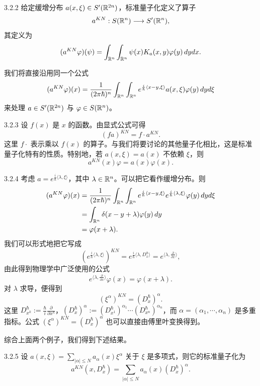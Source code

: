
\begin{proposition}{3.2.2}
给定缓增分布 $a(x,\xi)\in S'(\mathbb{R}^{2n})$，标准量子化定义了算子
\[
a^{KN}:S(\mathbb{R}^n)\longrightarrow S'(\mathbb{R}^n),
\]
其定义为
\[
(a^{KN}\varphi)(\psi)=\int_{\mathbb{R}^n}\int_{\mathbb{R}^n}\psi(x)K_a(x,y)\varphi(y)\,dydx.
\]
\end{proposition}

我们将直接沿用同一个公式
\[
(a^{KN}\varphi)(x)
=\frac{1}{(2\pi\hbar)^n}\int_{\mathbb{R}^n}\int_{\mathbb{R}^n}e^{\frac i\hbar\langle x-y,\xi\rangle}a(x,\xi)\varphi(y)\,dyd\xi
\]
来处理 $a\in S'(\mathbb{R}^{2n})$ 与 $\varphi\in S(\mathbb{R}^n)$。

\begin{example}{3.2.3}
设 $f(x)$ 是 $x$ 的函数。由显式公式可得
\[
(fa)^{KN}=f\cdot a^{KN}.
\]
这里 $f\cdot$ 表示乘以 $f(x)$ 的算子。与我们将要讨论的其他量子化相比，这是标准量子化特有的性质。特别地，若 $a(x,\xi)=a(x)$ 不依赖 $\xi$，则
\[
a^{KN}(x)\varphi=a(x)\varphi(x).
\]
\end{example}

\begin{example}{3.2.4}
考虑 $a=e^{\frac i\hbar\langle\lambda,\xi\rangle}$，其中 $\lambda\in\mathbb{R}^n$。可以把它看作缓增分布。则
\begin{align*}
(a^{KN}\varphi)(x)
&=\frac{1}{(2\pi\hbar)^n}\int_{\mathbb{R}^n}\int_{\mathbb{R}^n}e^{\frac i\hbar\langle x-y,\xi\rangle}e^{\frac i\hbar\langle\lambda,\xi\rangle}\varphi(y)\,dyd\xi\\
&=\int_{\mathbb{R}^n}\delta(x-y+\lambda)\varphi(y)\,dy\\
&=\varphi(x+\lambda).
\end{align*}
我们可以形式地把它写成
\[
\left(e^{\frac i\hbar\langle\lambda,\xi\rangle}\right)^{KN}
=e^{\frac i\hbar\langle\lambda,D_{x}^\hbar\rangle}
=e^{\langle\lambda,\frac{\partial}{\partial x}\rangle},
\]
由此得到物理学中广泛使用的公式
\[
e^{\langle\lambda,\frac{\partial}{\partial x}\rangle}\varphi(x)=\varphi(x+\lambda).
\]
对 $\lambda$ 求导，便得到
\[
(\xi^\alpha)^{KN}=(D_{x}^\hbar)^\alpha.
\]
这里 $D^\hbar_{x^k}:=\frac{\hbar}{i}\frac{\partial}{\partial x^k}$，$(D^\hbar_{x})^\alpha:=(D^\hbar_{x^1})^{\alpha_1}\cdots(D^\hbar_{x^n})^{\alpha_n}$，而 $\alpha=(\alpha_1,\cdots,\alpha_n)$ 是多重指标。公式 $(\xi^\alpha)^{KN}=(D_{x}^\hbar)^\alpha$ 也可以直接由傅里叶变换得到。
\end{example}

综合上面两个例子，我们得到下述结果。

\begin{proposition}{3.2.5}
设 $a(x,\xi)=\sum_{|\alpha|\le N}a_\alpha(x)\xi^\alpha$ 关于 $\xi$ 是多项式，则它的标准量子化为
\[
a^{KN}(x,D_{x}^\hbar)=\sum_{|\alpha|\le N}a_\alpha(x)(D_{x}^\hbar)^\alpha.
\]
\end{proposition}


